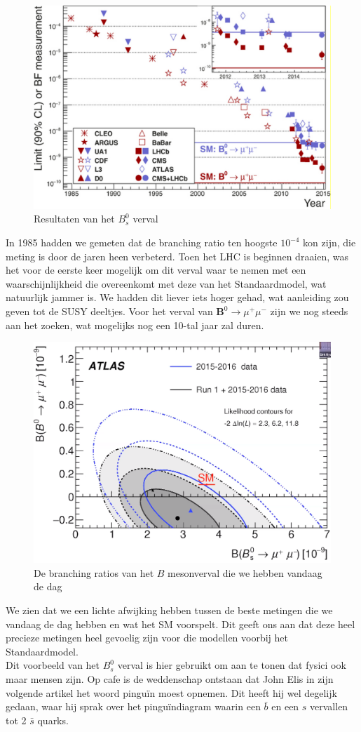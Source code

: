 \documentclass[../main.tex]{subfiles}
\begin{document}
\begin{figure}[h]
    \centering
    \includegraphics[width=0.6\linewidth]{physics_beyond_the_standard_model/bs_meson_verval_resultaten.png}
    \caption{Resultaten van het $B_s^0$ verval}%
    \label{fig:physics_beyond_the_standard_model/bs_meson_verval_resultaten}
\end{figure}

In 1985 hadden we gemeten dat de branching ratio ten hoogste $10^{-4}$ kon zijn, die meting is door de jaren heen verbeterd. Toen het LHC is beginnen draaien, was het voor de eerste keer mogelijk om dit verval waar te nemen met een waarschijnlijkheid die overeenkomt met deze van het Standaardmodel, wat natuurlijk jammer is. We hadden dit liever iets hoger gehad, wat aanleiding zou geven tot de SUSY deeltjes. Voor het verval van $\mathbf{B}^{0} \rightarrow \mu^{+} \mu^-$ zijn we nog steeds aan het zoeken, wat mogelijks nog een 10-tal jaar zal duren.

\begin{figure}[h]
    \centering
    \includegraphics[width=0.6\linewidth]{physics_beyond_the_standard_model/bs_meson_resultaten_vandaag.png}
    \caption{De branching ratios van het $B$ mesonverval die we hebben vandaag de dag}%
    \label{fig:physics_beyond_the_standard_model/bs_meson_resultaten_vandaag}
\end{figure}

We zien dat we een lichte afwijking hebben tussen de beste metingen die we vandaag de dag hebben en wat het SM voorspelt. Dit geeft ons aan dat deze heel precieze metingen heel gevoelig zijn voor die modellen voorbij het Standaardmodel.\\
Dit voorbeeld van het $B_s^0$ verval is hier gebruikt om aan te tonen dat fysici ook maar mensen zijn. Op cafe is de weddenschap ontstaan dat John Elis in zijn volgende artikel het woord pinguïn moest opnemen. Dit heeft hij wel degelijk gedaan, waar hij sprak over het pinguïndiagram waarin een $\bar{b}$ en een $s$ vervallen tot 2 $\bar{s}$ quarks.
\end{document}
